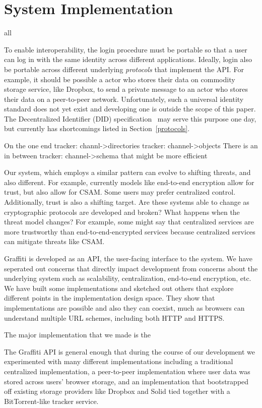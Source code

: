 \section{System Implementation}
all

To enable interoperability, the login procedure must be portable
so that a user can log in with the
same identity across different applications.
Ideally, login also be portable across different underlying
\emph{protocols} that implement the API.
For example, it should be possible a actor who stores their data on
commodity storage service, like Dropbox, to send a private message
to an actor who stores their data on a peer-to-peer network.
Unfortunately, such a universal identity standard does not yet exist
and developing one is outside the scope of this paper.
The Decentralized Identifier (DID) specification~\cite{dids} may serve this purpose one day,
but currently has shortcomings listed in Section~\ref{protocols}.


On the one end
tracker: channl->directories
tracker: channel->objects
There is an in between
tracker: channel->schema
that might be more efficient

Our system, which employs a similar pattern can evolve to shifting threats,
and also different. For example, currently models like end-to-end encryption
allow for trust, but also allow for CSAM. Some users may prefer centralized control.
Additionally, trust is also a shifting target.
Are these systems able to change as cryptographic protocols
are developed and broken?
What happens when the threat model changes? For example,
some might say that centralized services are more trustworthy
than end-to-end-encrypted services because centralized services can
mitigate threats like CSAM.

Graffiti is developed as an API, the user-facing interface to the system.
We have seperated out concerns that directly impact development from
concerns about the underlying system such as scalability,
centralization, end-to-end encryption, etc.
We have built some implementations and sketched out others
that explore different points in the implementation design space.
They show that implementations are possible and also they can coexist,
much as browsers can understand multiple URL schemes, including both HTTP and HTTPS.

The major implementation that we made is the


The Graffiti API is general enough that during the course of our development
we experimented with many different implementations including
a traditional centralized implementation, a peer-to-peer implementation where user
data was stored across users' browser storage, and an implementation that
bootstrapped off existing storage providers like Dropbox and Solid
tied together with a BitTorrent-like tracker service.

